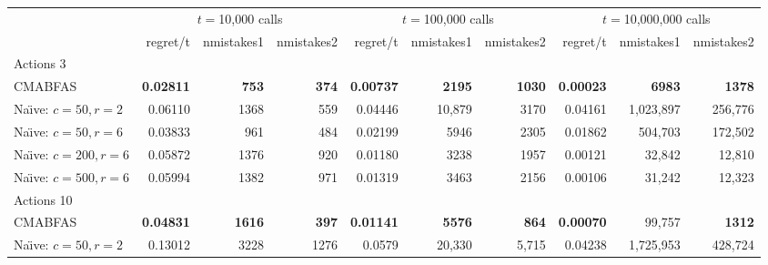 \documentclass{llncs}
\begin{document}
\begin{sidewaystable}
\begin{center}
\begin{tabular}{|l|rrr|rrr|rrr|}
\hline
& \multicolumn{3}{|c|}{$t=$10,000 calls} &\multicolumn{3}{|c|}{$t=$100,000 calls} &\multicolumn{3}{|c|}{$t=$10,000,000 calls}\\
                                     & regret/t & nmistakes1 & nmistakes2 & regret/t & nmistakes1 & nmistakes2 & regret/t & nmistakes1 & nmistakes2 \\
\hline
Actions 3                            &               &           &           &               &            &            &               &            &           \\
\hspace*{0.5cm}CMABFAS                & {\bf 0.02811} & {\bf 753} & {\bf 374} & {\bf 0.00737} & {\bf 2195} & {\bf 1030} & {\bf 0.00023} & {\bf 6983} & {\bf 1378}\\
\hspace*{0.5cm}Na\"{\i}ve: $c=50, r=2$     & 0.06110       & 1368      & 559       & 0.04446       & 10,879     & 3170       & 0.04161       & 1,023,897  & 256,776   \\  
\hspace*{0.5cm}Na\"{\i}ve: $c=50, r=6$     & 0.03833       & 961       & 484       & 0.02199       & 5946       & 2305       & 0.01862       & 504,703    & 172,502   \\
\hspace*{0.5cm}Na\"{\i}ve: $c=200, r=6$    & 0.05872       & 1376      & 920       & 0.01180       & 3238       & 1957       & 0.00121       & 32,842     & 12,810    \\
\hspace*{0.5cm}Na\"{\i}ve: $c=500, r=6$    & 0.05994       & 1382      & 971       & 0.01319       & 3463       & 2156       & 0.00106       & 31,242     & 12,323    \\
\hline
Actions 10                            &               &           &           &               &            &            &               &            &            \\
\hspace*{0.5cm}CMABFAS                & {\bf 0.04831} & {\bf 1616}& {\bf 397} & {\bf 0.01141} & {\bf 5576} & {\bf 864}  & {\bf 0.00070} & 99,757     & {\bf 1312} \\
\hspace*{0.5cm}Na\"{\i}ve: $c=50, r=2$     & 0.13012       & 3228      & 1276      & 0.0579        & 20,330     & 5,715      & 0.04238       & 1,725,953  & 428,724    \\

\end{tabular}
\end{center}
\end{sidewaystable}
\end{document}

